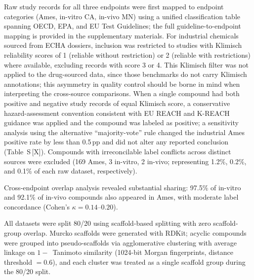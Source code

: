 Raw study records for all three endpoints were first mapped to endpoint categories (Ames, 
in-vitro CA, in-vivo MN) using a unified classification table spanning OECD, EPA, and EU 
Test Guidelines; the full guideline-to-endpoint mapping is provided in the supplementary 
materials. For industrial chemicals sourced from ECHA dossiers, inclusion was restricted to 
studies with Klimisch reliability scores of 1 (reliable without restriction) or 2 (reliable 
with restrictions) where available,\cite{Klimisch_1997} excluding records with score 3 or 4. 
This Klimisch filter was not applied to the drug-sourced data, since those benchmarks do not 
carry Klimisch annotations; this asymmetry in quality control should be borne in mind when 
interpreting the cross-source comparisons. When a single compound had both positive and 
negative study records of equal Klimisch score, a conservative hazard-assessment convention 
consistent with EU REACH and K-REACH guidance\cite{EU_REACH_2006,K_REACH_2018} was applied 
and the compound was labeled as positive; a sensitivity analysis using the alternative 
``majority-vote'' rule changed the industrial Ames positive rate by less than 0.5\,pp and 
did not alter any reported conclusion (Table~S\,[X]). Compounds with irreconcilable label 
conflicts across distinct sources were excluded (169 Ames, 3 in-vitro, 2 in-vivo; 
representing 1.2\%, 0.2\%, and 0.1\% of each raw dataset, respectively).


Cross-endpoint overlap analysis revealed substantial sharing: 97.5\% of in-vitro and 92.1\% 
of in-vivo compounds also appeared in Ames, with moderate label concordance 
(Cohen's $\kappa = 0.14$--$0.20$).

All datasets were split 80/20 using scaffold-based splitting\cite{Sheridan_2013} with zero 
scaffold-group overlap. Murcko scaffolds\cite{Bemis_Murcko_1996} were generated with 
RDKit;\cite{RDKit} acyclic compounds were grouped into pseudo-scaffolds via agglomerative 
clustering with average linkage on $1 -$~Tanimoto similarity (1024-bit Morgan 
fingerprints\cite{Rogers_Hahn_2010}, distance threshold $= 0.6$), and each cluster was 
treated as a single scaffold group during the 80/20 split.

